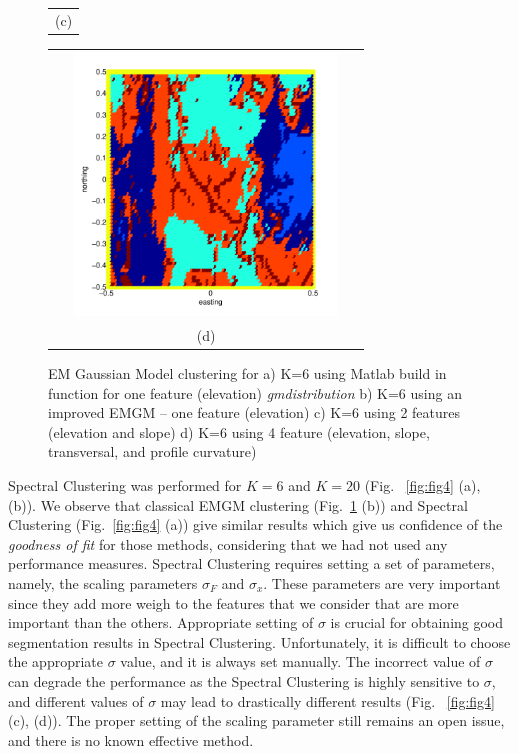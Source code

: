 \documentclass[12pt,letterpaper]{article}
\begin{document}
\begin{figure}[ht!]
\begin{minipage}[b]{0.5\textwidth}
\begin{tabular}{c}
      (c)
    \end{tabular}
  \end{minipage}
  \begin{minipage}{0.5\textwidth}
    \begin{tabular}{c}
      \includegraphics[width=8cm,height=7cm,keepaspectratio]{figs/GM_me_feat_4.pdf}\\
      (d)
    \end{tabular}
  \end{minipage}
   \caption{EM Gaussian Model clustering for a) K=6 using Matlab build in function for one feature (elevation) \textit{gmdistribution} b) K=6 using an improved EMGM -- one feature (elevation)  c) K=6 using 2 features (elevation and slope)  d) K=6 using 4 feature (elevation, slope, transversal, and profile curvature) }\label{fig:fig3}
\end{figure}

Spectral Clustering was performed for $K=6$ and $K=20$ (Fig. ~\ref{fig:fig4} (a), (b)). We observe that classical EMGM clustering (Fig.~\ref{fig:fig3} (b)) and Spectral Clustering (Fig.~\ref{fig:fig4} (a)) give similar results which give us confidence of the \textit{goodness of fit} for those methods, considering that we had not used any performance measures. 
Spectral Clustering requires setting a set of parameters, namely, the scaling parameters $\sigma_F$ and $\sigma_x$. These parameters are very important since they add more weigh to the features that we consider that are more important than the others.
Appropriate setting of $\sigma$ is crucial for obtaining good segmentation results in Spectral Clustering. Unfortunately, it is
difficult to choose the appropriate $\sigma$ value, and it is always set manually. The incorrect value of  $\sigma$ can degrade the performance as the Spectral Clustering is highly sensitive to $\sigma$, and different values of 
$\sigma$ may lead to drastically different results (Fig. ~\ref{fig:fig4} (c), (d)). The proper setting of the scaling parameter still remains an open issue, and there is no known effective method.
 
\end{document}
